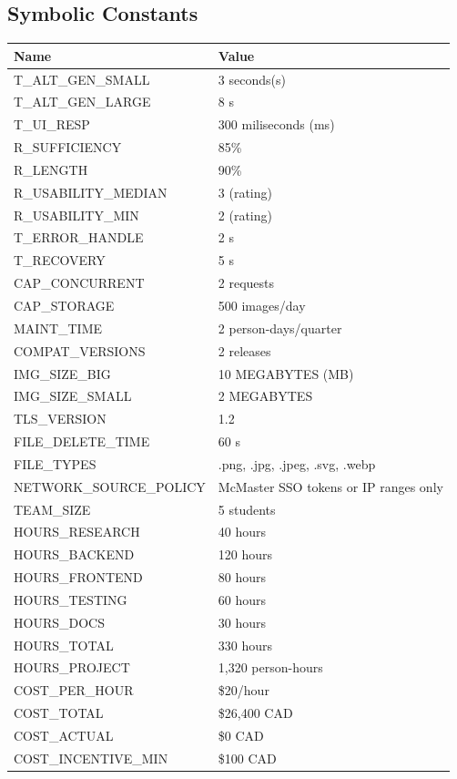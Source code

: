 \documentclass[12pt, titlepage]{article}
\begin{document}
\subsection{Symbolic Constants}
\begin{longtable}{|p{8.0cm}|p{8.0cm}|}
  \toprule
  {\textbf{Name}} & {\textbf{Value}}\\
  \midrule
  T\_ALT\_GEN\_SMALL & 3 seconds(s) \\
  T\_ALT\_GEN\_LARGE & 8 s \\
  T\_UI\_RESP & 300 miliseconds (ms) \\
  R\_SUFFICIENCY & 85\% \\
  R\_LENGTH & 90\% \\
  R\_USABILITY\_MEDIAN & 3 (rating) \\
  R\_USABILITY\_MIN & 2 (rating) \\
  T\_ERROR\_HANDLE & 2 s \\
  T\_RECOVERY & 5 s \\
  CAP\_CONCURRENT & 2 requests \\
  CAP\_STORAGE & 500 images/day \\
  MAINT\_TIME & 2 person-days/quarter \\
  COMPAT\_VERSIONS & 2 releases \\
  IMG\_SIZE\_BIG & 10 MEGABYTES (MB) \\
  IMG\_SIZE\_SMALL & 2 MEGABYTES \\
  TLS\_VERSION & 1.2 \\
  FILE\_DELETE\_TIME & 60 s \\
  FILE\_TYPES & .png, .jpg, .jpeg, .svg, .webp \\
  NETWORK\_SOURCE\_POLICY & McMaster SSO tokens or IP ranges only\\
  TEAM\_SIZE & 5 students \\
  HOURS\_RESEARCH & 40 hours \\
  HOURS\_BACKEND & 120 hours \\
  HOURS\_FRONTEND & 80 hours \\
  HOURS\_TESTING & 60 hours \\
  HOURS\_DOCS & 30 hours \\
  HOURS\_TOTAL & 330 hours \\
  HOURS\_PROJECT & 1,320 person-hours \\
  COST\_PER\_HOUR & \$20/hour \\
  COST\_TOTAL & \$26,400 CAD \\
  COST\_ACTUAL & \$0 CAD \\
  COST\_INCENTIVE\_MIN & \$100 CAD \\

\end{longtable}
\end{document}
